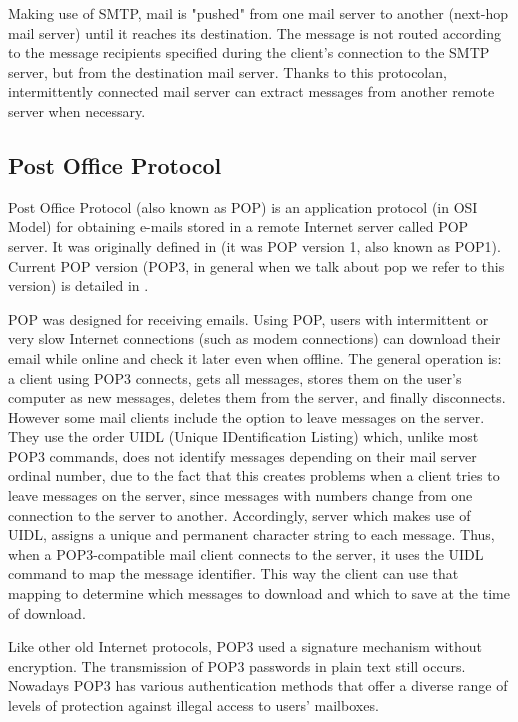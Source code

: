 Making use of SMTP, mail is "pushed" from one mail server to another (next-hop mail server) until it reaches its destination. The message is not routed according to the message recipients specified during the client's connection to the SMTP server, but from the destination mail server. Thanks to this protocolan, intermittently connected mail server can extract messages from another remote server when necessary.

\subsection{Post Office Protocol} \label{ssect:pop}

Post Office Protocol (also known as POP) is an application protocol (in OSI Model) for obtaining e-mails stored in a remote Internet server called POP server. It was originally defined in \cite{rfc918} (it was POP version 1, also known as POP1). Current POP version (POP3, in general when we talk about pop we refer to this version) is detailed in \cite{rfc1939}.

POP was designed for receiving emails. Using POP, users with intermittent or very slow Internet connections (such as modem connections) can download their email while online and check it later even when offline. The general operation is: a client using POP3 connects, gets all messages, stores them on the user's computer as new messages, deletes them from the server, and finally disconnects. However some mail clients include the option to leave messages on the server. They use the order UIDL (Unique IDentification Listing) which, unlike most POP3 commands, does not identify messages depending on their mail server ordinal number, due to the fact that this creates problems when a client tries to leave messages on the server, since messages with numbers change from one connection to the server to another. Accordingly, server which makes use of UIDL, assigns a unique and permanent character string to each message. Thus, when a POP3-compatible mail client connects to the server, it uses the UIDL command to map the message identifier. This way the client can use that mapping to determine which messages to download and which to save at the time of download.

Like other old Internet protocols, POP3 used a signature mechanism without encryption. The transmission of POP3 passwords in plain text still occurs. Nowadays POP3 has various authentication methods that offer a diverse range of levels of protection against illegal access to users' mailboxes.

